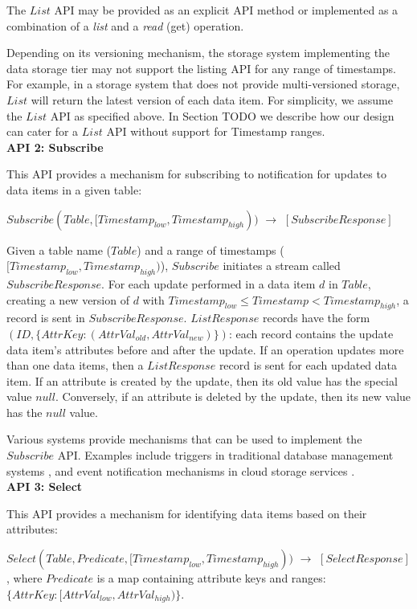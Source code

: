 The $List$ API may be provided as an explicit API method or implemented as a combination of a \textit{list} and a
\textit{read} (get) operation.

Depending on its versioning mechanism, the storage system implementing the data storage tier may not support the
listing API for any range of timestamps.
For example, in a storage system that does not provide multi-versioned storage, $List$ will return the latest version of
each data item.
For simplicity, we assume the $List$ API as specified above.
In Section
TODO
we describe how our design can cater for a $List$ API without support for Timestamp ranges.
\\

\noindent
\textbf{API 2: Subscribe}

\noindent
This API provides a mechanism for subscribing to notification for updates to data items in a given table:

$Subscribe(Table, [Timestamp_{low}, Timestamp_{high}))$ $\rightarrow$ $[SubscribeResponse]$

\noindent
Given a table name ($Table$) and a range of timestamps ($[Timestamp_{low}, Timestamp_{high})$),
$Subscribe$ initiates a stream called $SubscribeResponse$.
For each update performed in a data item $d$ in $Table$, creating a new version of $d$ with
$Timestamp_{low} \leq Timestamp < Timestamp_{high}$, a record is sent in $SubscribeResponse$.
$ListResponse$ records have the form $(ID, \{AttrKey: (AttrVal_{old}, AttrVal_{new})\})$:
each record contains the update data item's attributes before and after the update.
If an operation updates more than one data items, then a $ListResponse$ record is sent for each updated
data item.
If an attribute is created by the update, then its old value has the special value $null$.
Conversely, if an attribute is deleted by the update, then its new value has the $null$ value.

Various systems provide mechanisms that can be used to implement the $Subscribe$ API.
Examples include triggers in traditional database management systems \cite{mariadb:triggers}, and event notification
mechanisms in cloud storage services \cite{awss3:notifications}.
\\

\noindent
\textbf{API 3: Select}

\noindent
This API provides a mechanism for identifying data items based on their attributes:

$Select(Table, Predicate, [Timestamp_{low}, Timestamp_{high}))$ $\rightarrow$ $[SelectResponse]$,
where $Predicate$ is a map containing attribute keys and ranges:
$\{AttrKey: [AttrVal_{low}, AttrVal_{high})\}$.

